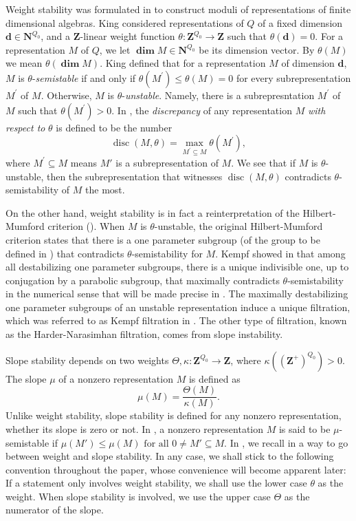 \documentclass[a4paper]{amsart}
\numberwithin{equation}{section}
\theoremstyle{plain}
\theoremstyle{definition}
\DeclareMathOperator{\disc}{disc}
\begin{document}
Weight stability was formulated in \cite{MR1315461} to construct moduli of representations of finite dimensional algebras. King considered representations of $Q$ of a fixed dimension $\mathbf{d}\in\mathbf{N}^{Q_0}$, and a $\mathbf{Z}$-linear weight function $\theta:\mathbf{Z}^{Q_{0}}\rightarrow\mathbf{Z}$ such that $\theta(\mathbf{d})=0$. For a representation $M$ of $Q$, we let $\pmb{\dim}M\in \mathbf{N}^{Q_{0}}$ be its dimension vector. By $\theta(M)$ we mean $\theta(\pmb{\dim}M).$ King defined that for a representation $M$ of dimension $\mathbf{d}$, $M$ is $\theta$-\emph{semistable} if and only if  $\theta(M^{\prime})\leq \theta(M)=0$ for every subrepresentation $M^{\prime}$ of $M$. Otherwise, $M$ is $\theta$-\emph{unstable}. Namely, there is a subrepresntation $M^{\prime}$ of $M$ such that $\theta(M^{\prime})>0.$ In \cite{MR4238986}, the \emph{discrepancy} of any representation $M$ \emph{with respect to }$\theta$ is defined to be the number  
$$\disc(M,\theta) = \max _{M^{\prime}\subseteq M}\theta(M^{\prime}),$$ where $M^{\prime}\subseteq M$ means $M'$ is a subrepresentation of $M$. We see that if $M$ is $\theta$-unstable, then the subrepresentation that witnesses  $\disc(M,\theta)$ contradicts $\theta$-semistability of $M$ the most.

On the other hand, weight stability is in fact a reinterpretation of the Hilbert-Mumford criterion ().  When $M$ is $\theta$-unstable, the original Hilbert-Mumford criterion states that there is a one parameter subgroup (of the group to be defined in ) that contradicts $\theta$-semistability for $M$. Kempf showed in \cite{MR506989} that among all destabilizing one parameter subgroups, there is a unique indivisible one, up to conjugation by  a parabolic subgroup, that maximally contradicts $\theta$-semistability in the numerical sense that will be made precise in  . The maximally destabilizing one parameter subgroups of an unstable representation induce a unique filtration, which was referred to as Kempf filtration in \cite{MR3199484}. The other type of filtration, known as the Harder-Narasimhan filtration, comes from slope instability.

Slope stability depends on two weights $\Theta,\kappa:\mathbf{Z}^{Q_0}\rightarrow\mathbf{Z}$, where $\kappa((\mathbf{Z}^{+})^{Q_0})>0$. The slope $\mu$ of a nonzero representation $M$ is defined as $$\mu(M)=\frac{\Theta(M)}{\kappa(M)}.$$ Unlike weight stability, slope stability is defined for any nonzero representation, whether its slope is zero or not. In \cite{MR1906875}, a nonzero representation $M$ is said to be $\mu$-semistable if $\mu(M')\leq \mu(M)\text{ for all }0\neq M'\subseteq M.$ In , we recall in  a  way to go between weight and slope stability. In any case,  we shall stick to the following convention throughout the paper, whose convenience will become apparent later: If a statement only involves weight stability, we shall use the lower case $\theta$ as the weight. When slope stability is involved, we use the upper case $\Theta$ as the numerator of the slope. 
\end{document}

